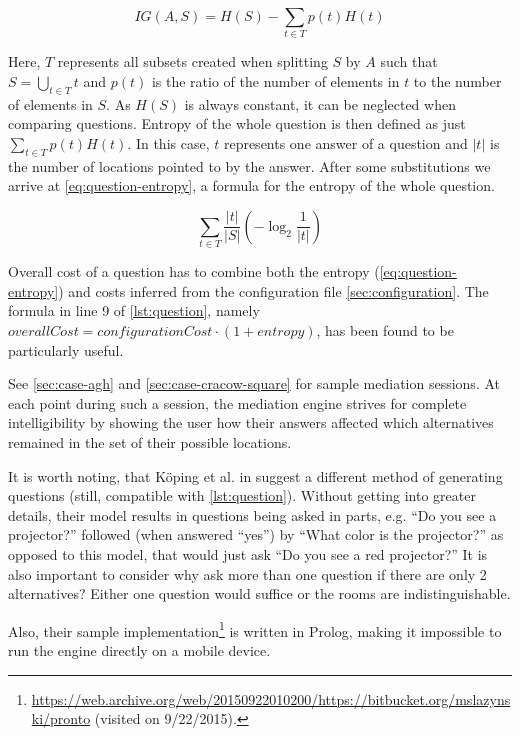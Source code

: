 \begin{equation}
  \label{eq:information-gain}
  IG(A,S) = H(S) - \sum_{t \in T} p(t)H(t)
\end{equation}

Here, $T$ represents all subsets created when splitting $S$ by $A$ such that $S = \bigcup_{t \in T} t$ and $p(t)$ is the ratio of the number of elements in $t$ to the number of elements in $S$. As $H(S)$ is always constant, it can be neglected when comparing questions. Entropy of the whole question is then defined as just $\sum_{t \in T} p(t)H(t)$. In this case, $t$ represents one answer of a question and $\vert t \vert$ is the number of locations pointed to by the answer. After some substitutions we arrive at \cref{eq:question-entropy}, a formula for the entropy of the whole question.

\begin{equation}
  \label{eq:question-entropy}
  \sum_{t \in T} \frac{\vert t \vert}{\vert S \vert}\left(-\log_2 \frac{1}{\vert t \vert}\right)
\end{equation}

Overall cost of a question has to combine both the entropy (\cref{eq:question-entropy}) and costs inferred from the configuration file \cref{sec:configuration}. The formula in line 9 of \cref{lst:question}, namely $overallCost = configurationCost \cdot (1 + entropy)$, has been found to be particularly useful.

See \cref{sec:case-agh} and \cref{sec:case-cracow-square} for sample mediation sessions. At each point during such a session, the mediation engine strives for complete intelligibility by showing the user how their answers affected which alternatives remained in the set of their possible locations.

It is worth noting, that Köping et al. in \cite{Koeping2015indoor} suggest a different method of generating questions (still, compatible with \cref{lst:question}). Without getting into greater details, their model results in questions being asked in parts, e.g. ``Do you see a projector?'' followed (when answered ``yes'') by ``What color is the projector?'' as opposed to this model, that would just ask ``Do you see a red projector?'' It is also important to consider why ask more than one question if there are only 2 alternatives? Either one question would suffice or the rooms are indistinguishable.

Also, their sample implementation\footnote{\url{https://web.archive.org/web/20150922010200/https://bitbucket.org/mslazynski/pronto} (visited on 9/22/2015).} is written in Prolog, making it impossible to run the engine directly on a mobile device.

